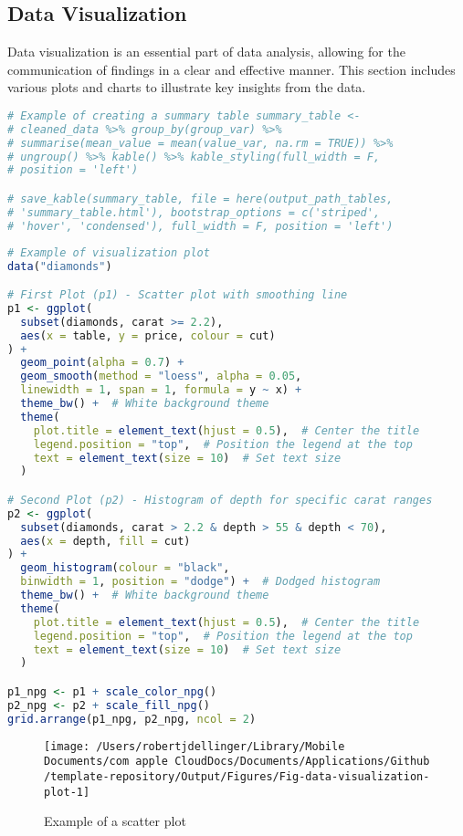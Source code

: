 \documentclass[
  12pt,
]{article}
\begin{document}
\subsection{Data Visualization}\label{data-visualization}

Data visualization is an essential part of data analysis, allowing for
the communication of findings in a clear and effective manner. This
section includes various plots and charts to illustrate key insights
from the data.

\begin{lstlisting}[language=R]
# Example of creating a summary table summary_table <-
# cleaned_data %>% group_by(group_var) %>%
# summarise(mean_value = mean(value_var, na.rm = TRUE)) %>%
# ungroup() %>% kable() %>% kable_styling(full_width = F,
# position = 'left')

# save_kable(summary_table, file = here(output_path_tables,
# 'summary_table.html'), bootstrap_options = c('striped',
# 'hover', 'condensed'), full_width = F, position = 'left')
\end{lstlisting}

\begin{lstlisting}[language=R]
# Example of visualization plot
data("diamonds")

# First Plot (p1) - Scatter plot with smoothing line
p1 <- ggplot(
  subset(diamonds, carat >= 2.2),
  aes(x = table, y = price, colour = cut)
) +
  geom_point(alpha = 0.7) +  
  geom_smooth(method = "loess", alpha = 0.05,
  linewidth = 1, span = 1, formula = y ~ x) +  
  theme_bw() +  # White background theme
  theme(
    plot.title = element_text(hjust = 0.5),  # Center the title
    legend.position = "top",  # Position the legend at the top
    text = element_text(size = 10)  # Set text size
  )

# Second Plot (p2) - Histogram of depth for specific carat ranges
p2 <- ggplot(
  subset(diamonds, carat > 2.2 & depth > 55 & depth < 70),
  aes(x = depth, fill = cut)
) +
  geom_histogram(colour = "black",
  binwidth = 1, position = "dodge") +  # Dodged histogram
  theme_bw() +  # White background theme
  theme(
    plot.title = element_text(hjust = 0.5),  # Center the title
    legend.position = "top",  # Position the legend at the top
    text = element_text(size = 10)  # Set text size
  )

p1_npg <- p1 + scale_color_npg()
p2_npg <- p2 + scale_fill_npg()
grid.arrange(p1_npg, p2_npg, ncol = 2)
\end{lstlisting}

\begin{figure}

{\centering \texttt{[image: /Users/robertjdellinger/Library/Mobile Documents/com~apple~CloudDocs/Documents/Applications/Github/template-repository/Output/Figures/Fig-data-visualization-plot-1]} 

}

\caption{Example of a scatter plot}\label{fig:data-visualization-plot}
\end{figure}
\end{document}

